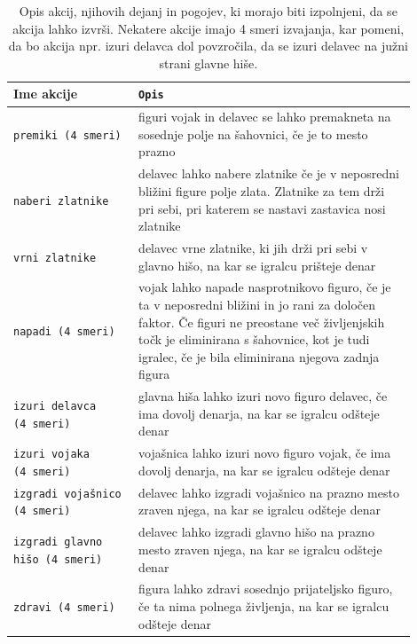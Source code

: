 \documentclass[a4paper, 12pt]{book}
\begin{document}
\begin{table}
	\begin{center}
		\begin{tabular}{p{0.28\linewidth}|p{0.62\linewidth}}
			Ime akcije                          & {\tt Opis} \\ \hline
			{\tt premiki (4~smeri)}             & figuri vojak in delavec se lahko premakneta na sosednje polje na šahovnici, če je to mesto prazno \\
			{\tt naberi zlatnike}               & delavec lahko nabere zlatnike če je v neposredni bližini figure polje zlata. Zlatnike za tem drži pri sebi, pri katerem se nastavi zastavica nosi zlatnike\\
			{\tt vrni zlatnike}                 & delavec vrne zlatnike, ki jih drži pri sebi v glavno hišo, na kar se igralcu prišteje denar \\
			{\tt napadi (4~smeri)}              & vojak lahko napade nasprotnikovo figuro, če je ta v neposredni bližini in jo rani za določen faktor. Če figuri ne preostane več življenjskih točk je eliminirana s šahovnice, kot je tudi igralec, če je bila eliminirana njegova zadnja figura \\
			{\tt izuri delavca (4~smeri)}       & glavna hiša lahko izuri novo figuro delavec, če ima dovolj denarja, na kar se igralcu odšteje denar\\
			{\tt izuri vojaka (4~smeri)}        & vojašnica lahko izuri novo figuro vojak, če ima dovolj denarja, na kar se igralcu odšteje denar \\
			{\tt izgradi vojašnico (4~smeri)}   & delavec lahko izgradi vojašnico na prazno mesto zraven njega, na kar se igralcu odšteje denar \\
			{\tt izgradi glavno hišo (4~smeri)} & delavec lahko izgradi glavno hišo na prazno mesto zraven njega, na kar se igralcu odšteje denar \\
			{\tt zdravi (4~smeri)}              & figura lahko zdravi sosednjo prijateljsko figuro, če ta nima polnega življenja, na kar se igralcu odšteje denar\\
		\end{tabular}
	\end{center}
	\caption{Opis akcij, njihovih dejanj in pogojev, ki morajo biti izpolnjeni, da se akcija lahko izvrši. Nekatere akcije imajo 4 smeri izvajanja, kar pomeni, da bo akcija npr. izuri delavca dol povzročila, da se izuri delavec na južni strani glavne hiše.}
	\label{tableActions}
\end{table}
\end{document}

